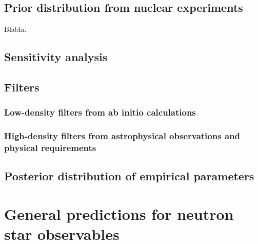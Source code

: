 \subsection{Prior distribution from nuclear experiments}\label{subsec:prior}

Blabla.




\subsection{Sensitivity analysis} %

\subsection{Filters} %

\subsubsection{Low-density filters from ab initio calculations} %


\subsubsection{High-density filters from astrophysical observations and 
physical requirements} %



\subsection{Posterior distribution of empirical parameters} %


\section{General predictions for neutron star observables}\label{sec:general}

